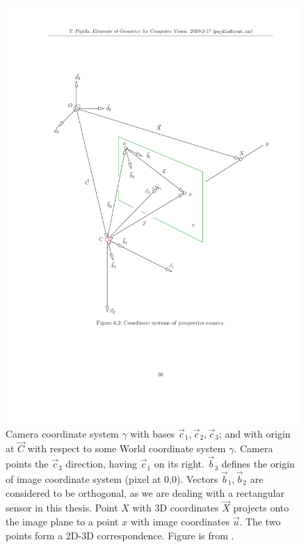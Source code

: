 \documentclass[twoside]{ctuthesis}
\theoremstyle{plain}
\theoremstyle{definition}
\theoremstyle{note}
\begin{document}
\begin{figure}[htb!]
	\centering
	\includegraphics[width=1.0\textwidth,viewport=2.93cm 7.54cm 19.49cm 25.3cm,clip]{GVG_page_cameraCS.pdf}
	\caption[Camera coordinate system]{Camera coordinate system $\gamma$ with bases $\vec c_1, \vec c_2, \vec c_3$; and with origin at $\vec C$ with respect to some World coordinate system $\gamma$. Camera points the $\vec c_3$ direction, having $\vec c_1$ on its right. $\vec b_3$ defines the origin of image coordinate system (pixel at 0,0). Vectors $\vec b_1, \vec b_2$ are considered to be orthogonal, as we are dealing with a rectangular sensor in this thesis. Point $X$ with 3D coordinates $\vec X$ projects onto the image plane to a point $x$ with image coordinates $\vec u$. The two points form a 2D-3D correspondence. Figure is from \cite{GVG}.}
	\label{fig:cameraCoordinateSystem}
\end{figure}
\end{document}
